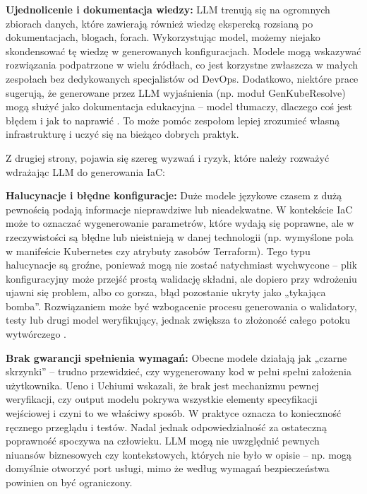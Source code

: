 \textbf{Ujednolicenie i dokumentacja wiedzy:} LLM trenują się na ogromnych zbiorach danych, które zawierają również wiedzę ekspercką rozsianą po dokumentacjach, blogach, forach. Wykorzystując model, możemy niejako skondensować tę wiedzę w generowanych konfiguracjach. Modele mogą wskazywać rozwiązania podpatrzone w wielu źródłach, co jest korzystne zwłaszcza w małych zespołach bez dedykowanych specjalistów od DevOps. Dodatkowo, niektóre prace sugerują, że generowane przez LLM wyjaśnienia (np. moduł GenKubeResolve) mogą służyć jako dokumentacja edukacyjna – model tłumaczy, dlaczego coś jest błędem i jak to naprawić \cite{malul_genkubesec_2024}. To może pomóc zespołom lepiej zrozumieć własną infrastrukturę i uczyć się na bieżąco dobrych praktyk.

Z drugiej strony, pojawia się szereg wyzwań i ryzyk, które należy rozważyć wdrażając LLM do generowania IaC:

\textbf{Halucynacje i błędne konfiguracje:} Duże modele językowe czasem z dużą pewnością podają informacje nieprawdziwe lub nieadekwatne. W kontekście IaC może to oznaczać wygenerowanie parametrów, które wydają się poprawne, ale w rzeczywistości są błędne lub nieistnieją w danej technologii (np. wymyślone pola w manifeście Kubernetes czy atrybuty zasobów Terraform). Tego typu halucynacje są groźne, ponieważ mogą nie zostać natychmiast wychwycone – plik konfiguracyjny może przejść prostą walidację składni, ale dopiero przy wdrożeniu ujawni się problem, albo co gorsza, błąd pozostanie ukryty jako „tykająca bomba”. Rozwiązaniem może być wzbogacenie procesu generowania o walidatory, testy lub drugi model weryfikujący, jednak zwiększa to złożoność całego potoku wytwórczego \cite{low_repairing_2024}.

\textbf{Brak gwarancji spełnienia wymagań:} Obecne modele działają jak „czarne skrzynki” – trudno przewidzieć, czy wygenerowany kod w pełni spełni założenia użytkownika. Ueno i Uchiumi \cite{ueno_migrating_2024} wskazali, że brak jest mechanizmu pewnej weryfikacji, czy output modelu pokrywa wszystkie elementy specyfikacji wejściowej i czyni to we właściwy sposób. W praktyce oznacza to konieczność ręcznego przeglądu i testów. Nadal jednak odpowiedzialność za ostateczną poprawność spoczywa na człowieku. LLM mogą nie uwzględnić pewnych niuansów biznesowych czy kontekstowych, których nie było w opisie – np. mogą domyślnie otworzyć port usługi, mimo że według wymagań bezpieczeństwa powinien on być ograniczony.


